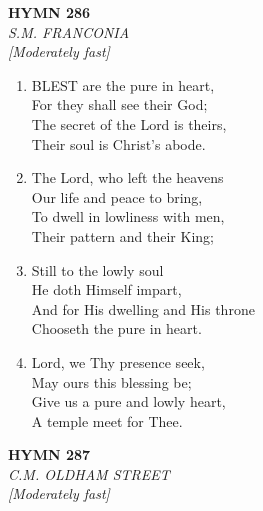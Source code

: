 \newpage
\begin{center}
    {\Large \textbf{HYMN 286}}
    \\
    \textit{S.M. FRANCONIA}
    \\
    \textit{\small [Moderately fast]}
\end{center}
\vspace{1em}

\begin{enumerate}
    \item BLEST are the pure in heart, \\
        For they shall see their God; \\
        The secret of the Lord is theirs, \\
        Their soul is Christ's abode.

    \item The Lord, who left the heavens \\
        Our life and peace to bring, \\
        To dwell in lowliness with men, \\
        Their pattern and their King;

    \item Still to the lowly soul \\
        He doth Himself impart, \\
        And for His dwelling and His throne \\
        Chooseth the pure in heart.

    \item Lord, we Thy presence seek, \\
        May ours this blessing be; \\
        Give us a pure and lowly heart, \\
        A temple meet for Thee.

\end{enumerate}

\newpage
\begin{center}
    {\Large \textbf{HYMN 287}}
    \\
    \textit{C.M. OLDHAM STREET}
    \\
    \textit{\small [Moderately fast]}
\end{center}
\vspace{1em}

